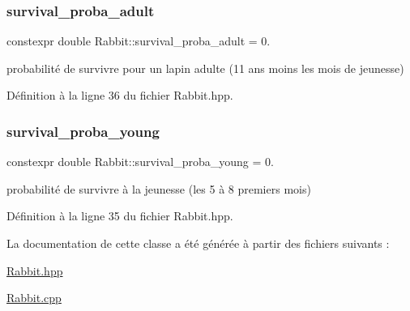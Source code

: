 \mbox{\label{classRabbit_a8b8affe7fcdc56e08da384d8d82ec556}} 
\subsubsection{\texorpdfstring{survival\+\_\+proba\+\_\+adult}{survival\_proba\_adult}}
{\footnotesize\ttfamily constexpr double Rabbit\+::survival\+\_\+proba\+\_\+adult = 0.\hspace{0.3cm}{\ttfamily [static]}}



probabilité de survivre pour un lapin adulte (11 ans moins les mois de jeunesse) 



Définition à la ligne 36 du fichier Rabbit.\+hpp.

\mbox{\label{classRabbit_ac6dc736f2b0395fa8692461a457a5297}} 
\subsubsection{\texorpdfstring{survival\+\_\+proba\+\_\+young}{survival\_proba\_young}}
{\footnotesize\ttfamily constexpr double Rabbit\+::survival\+\_\+proba\+\_\+young = 0.\hspace{0.3cm}{\ttfamily [static]}}



probabilité de survivre à la jeunesse (les 5 à 8 premiers mois) 



Définition à la ligne 35 du fichier Rabbit.\+hpp.



La documentation de cette classe a été générée à partir des fichiers suivants \+:\begin{DoxyCompactItemize}
\item 
\hyperlink{Rabbit_8hpp}{Rabbit.\+hpp}\item 
\hyperlink{Rabbit_8cpp}{Rabbit.\+cpp}\end{DoxyCompactItemize}
